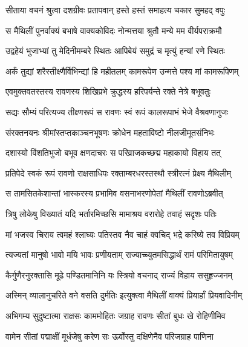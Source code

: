 
\twolineshloka
{सीताया वचनं श्रुत्वा दशग्रीवः प्रतापवान्}
{हस्ते हस्तं समाहत्य चकार सुमहद् वपुः} %

\twolineshloka
{स मैथिलीं पुनर्वाक्यं बभाषे वाक्यकोविदः}
{नोन्मत्तया श्रुतौ मन्ये मम वीर्यपराक्रमौ} %

\twolineshloka
{उद्वहेयं भुजाभ्यां तु मेदिनीमम्बरे स्थितः}
{आपिबेयं समुद्रं च मृत्युं हन्यां रणे स्थितः} %

\twolineshloka
{अर्कं तुद्यां शरैस्तीक्ष्णैर्विभिन्द्यां हि महीतलम्}
{कामरूपेण उन्मत्ते पश्य मां कामरूपिणम्} %

\twolineshloka
{एवमुक्तवतस्तस्य रावणस्य शिखिप्रभे}
{क्रुद्धस्य हरिपर्यन्ते रक्ते नेत्रे बभूवतुः} %

\twolineshloka
{सद्यः सौम्यं परित्यज्य तीक्ष्णरूपं स रावणः}
{स्वं रूपं कालरूपाभं भेजे वैश्रवणानुजः} %

\twolineshloka
{संरक्तनयनः श्रीमांस्तप्तकाञ्चनभूषणः}
{क्रोधेन महताविष्टो नीलजीमूतसंनिभः} %

\twolineshloka
{दशास्यो विंशतिभुजो बभूव क्षणदाचरः}
{स परिव्राजकच्छद्म महाकायो विहाय तत्} %

\twolineshloka
{प्रतिपेदे स्वकं रूपं रावणो राक्षसाधिपः}
{रक्ताम्बरधरस्तस्थौ स्त्रीरत्नं प्रेक्ष्य मैथिलीम्} %

\twolineshloka
{स तामसितकेशान्तां भास्करस्य प्रभामिव}
{वसनाभरणोपेतां मैथिलीं रावणोऽब्रवीत्} %

\twolineshloka
{त्रिषु लोकेषु विख्यातं यदि भर्तारमिच्छसि}
{मामाश्रय वरारोहे तवाहं सदृशः पतिः} %

\twolineshloka
{मां भजस्व चिराय त्वमहं श्लाघ्यः पतिस्तव}
{नैव चाहं क्वचिद् भद्रे करिष्ये तव विप्रियम्} %

\twolineshloka
{त्यज्यतां मानुषो भावो मयि भावः प्रणीयताम्}
{राज्याच्च्युतमसिद्धार्थं रामं परिमितायुषम्} %

\twolineshloka
{कैर्गुणैरनुरक्तासि मूढे पण्डितमानिनि}
{यः स्त्रियो वचनाद् राज्यं विहाय ससुहृज्जनम्} %

\twolineshloka
{अस्मिन् व्यालानुचरिते वने वसति दुर्मतिः}
{इत्युक्त्वा मैथिलीं वाक्यं प्रियार्हां प्रियवादिनीम्} %

\twolineshloka
{अभिगम्य सुदुष्टात्मा राक्षसः काममोहितः}
{जग्राह रावणः सीतां बुधः खे रोहिणीमिव} %

\twolineshloka
{वामेन सीतां पद्माक्षीं मूर्धजेषु करेण सः}
{ऊर्वोस्तु दक्षिणेनैव परिजग्राह पाणिना} %

